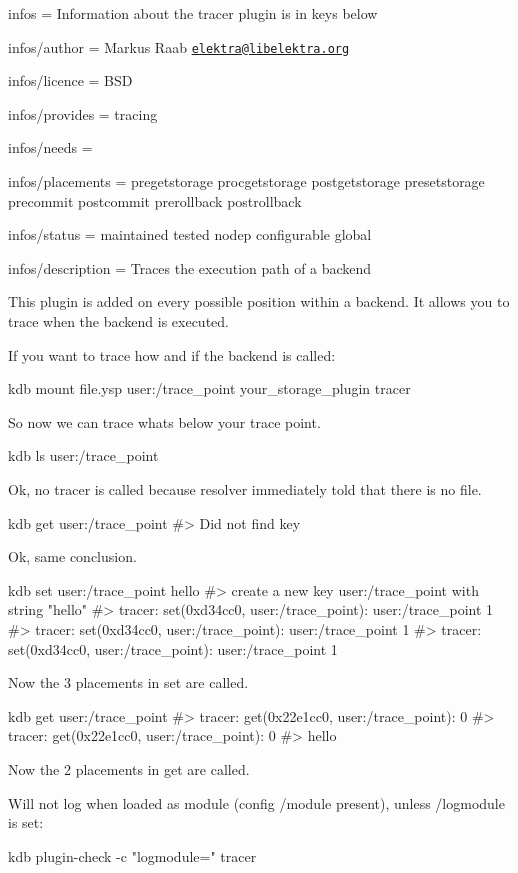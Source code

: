 
\begin{DoxyItemize}
\item infos = Information about the tracer plugin is in keys below
\item infos/author = Markus Raab \href{mailto:elektra@libelektra.org}{\tt elektra@libelektra.\+org}
\item infos/licence = B\+SD
\item infos/provides = tracing
\item infos/needs =
\item infos/placements = pregetstorage procgetstorage postgetstorage presetstorage precommit postcommit prerollback postrollback
\item infos/status = maintained tested nodep configurable global
\item infos/description = Traces the execution path of a backend
\end{DoxyItemize}

This plugin is added on every possible position within a backend. It allows you to trace when the backend is executed.

If you want to trace how and if the backend is called\+:


\begin{DoxyCode}
kdb mount file.ysp user:/trace\_point your\_storage\_plugin tracer
\end{DoxyCode}


So now we can trace whats below your trace point.


\begin{DoxyCode}
kdb ls user:/trace\_point
\end{DoxyCode}


Ok, no tracer is called because resolver immediately told that there is no file.


\begin{DoxyCode}
kdb get user:/trace\_point
#> Did not find key
\end{DoxyCode}


Ok, same conclusion.


\begin{DoxyCode}
kdb set user:/trace\_point hello
#> create a new key user:/trace\_point with string "hello"
#> tracer: set(0xd34cc0, user:/trace\_point): user:/trace\_point 1
#> tracer: set(0xd34cc0, user:/trace\_point): user:/trace\_point 1
#> tracer: set(0xd34cc0, user:/trace\_point): user:/trace\_point 1
\end{DoxyCode}


Now the 3 placements in set are called.


\begin{DoxyCode}
kdb get user:/trace\_point
#> tracer: get(0x22e1cc0, user:/trace\_point): 0
#> tracer: get(0x22e1cc0, user:/trace\_point): 0
#> hello
\end{DoxyCode}


Now the 2 placements in get are called.

Will not log when loaded as module (config {\ttfamily /module} present), unless {\ttfamily /logmodule} is set\+:


\begin{DoxyCode}
kdb plugin-check -c "logmodule=" tracer
\end{DoxyCode}
 